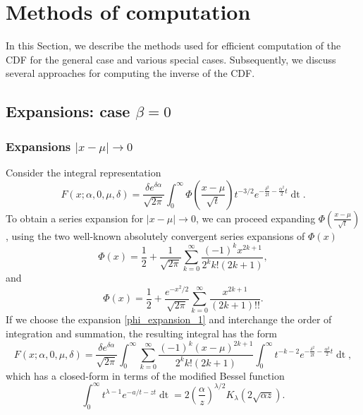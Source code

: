 \documentclass[10pt,a4paper,oneside]{article}
\numberwithin{equation}{section}
\begin{document}
\section{Methods of computation}
In this Section, we describe the methods used for efficient computation of the CDF for the general case and various special cases. Subsequently, we discuss several approaches for computing the inverse of the CDF.
\subsection{Expansions: case $\beta = 0$}

\subsubsection{Expansions $|x-\mu| \to 0$}
Consider the integral representation
\begin{equation}\label{integral_phi2}
F(x; \alpha, 0, \mu, \delta) = \frac{\delta e^{\delta \alpha}}{\sqrt{2\pi}} \int_0^{\infty} \Phi\left(\frac{x - \mu}{\sqrt{t}}\right) t^{-3/2} e^{-\frac{\delta^2}{2t} - \frac{\alpha^2}{2}t} \mathop{dt}.
\end{equation}
To obtain a series expansion for $|x-\mu| \to 0$, we can proceed expanding $\Phi\left(\frac{x-\mu}{\sqrt{t}}\right)$, using the two well-known absolutely convergent series expansions of $\Phi(x)$ \cite[\S 2]{Lebedev1972}
\begin{equation}\label{phi_expansion_1}
\Phi(x) = \frac{1}{2} + \frac{1}{\sqrt{2\pi}}\sum_{k=0}^{\infty} \frac{(-1)^k x^{2k + 1}}{2^k k! (2k+1)},
\end{equation}
and
\begin{equation}\label{phi_expansion_2}
\Phi(x) = \frac{1}{2} + \frac{e^{-x^2 / 2}}{\sqrt{2\pi}}\sum_{k=0}^{\infty} \frac{x^{2k+1}}{(2k + 1)!!}.
\end{equation}
If we choose the expansion \eqref{phi_expansion_1} and interchange the order of integration and summation, the resulting integral has the form
\begin{equation}\label{phi_expansion_integral_xmu_b0_alternating}
F(x; \alpha, 0, \mu, \delta) = \frac{\delta e^{\delta \alpha}}{\sqrt{2\pi}} \int_0^{\infty}\sum_{k=0}^{\infty} \frac{(-1)^k (x-\mu)^{2k + 1}}{2^k k! (2k + 1)}\int_0^{\infty} t^{-k-2} e^{-\frac{\delta^2}{2t} - \frac{\alpha^2}{2}t} \mathop{dt},
\end{equation}
which has a closed-form in terms of the modified Bessel function
\begin{equation}\label{bessel_integral}
\int_0^{\infty} t^{\lambda - 1}e^{-a/t - zt} \mathop{dt} = 2\left(\frac{\alpha}{z}\right)^{\lambda/2} K_{\lambda}(2\sqrt{\alpha z}).
\end{equation}
\end{document}
